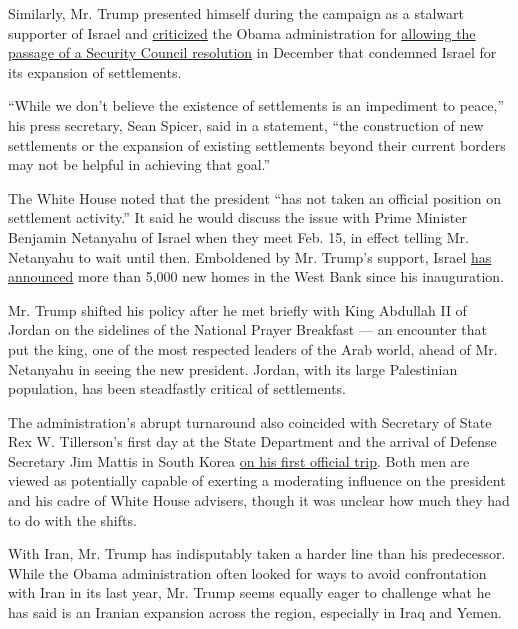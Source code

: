 Similarly, Mr. Trump presented himself during the campaign as a stalwart
supporter of Israel and
\href{https://www.nytimes3xbfgragh.onion/2016/12/22/world/middleeast/donald-trump-united-nations-israel-settlements.html}{criticized}
the Obama administration for
\href{https://www.nytimes3xbfgragh.onion/2016/12/23/world/middleeast/israel-settlements-un-vote.html}{allowing
the passage of a Security Council resolution} in December that condemned
Israel for its expansion of settlements.

``While we don't believe the existence of settlements is an impediment
to peace,'' his press secretary, Sean Spicer, said in a statement, ``the
construction of new settlements or the expansion of existing settlements
beyond their current borders may not be helpful in achieving that
goal.''

The White House noted that the president ``has not taken an official
position on settlement activity.'' It said he would discuss the issue
with Prime Minister Benjamin Netanyahu of Israel when they meet Feb. 15,
in effect telling Mr. Netanyahu to wait until then. Emboldened by Mr.
Trump's support, Israel
\href{https://www.nytimes3xbfgragh.onion/2017/02/01/world/middleeast/israel-3000-homes-west-bank.html}{has
announced} more than 5,000 new homes in the West Bank since his
inauguration.

Mr. Trump shifted his policy after he met briefly with King Abdullah II
of Jordan on the sidelines of the National Prayer Breakfast --- an
encounter that put the king, one of the most respected leaders of the
Arab world, ahead of Mr. Netanyahu in seeing the new president. Jordan,
with its large Palestinian population, has been steadfastly critical of
settlements.

The administration's abrupt turnaround also coincided with Secretary of
State Rex W. Tillerson's first day at the State Department and the
arrival of Defense Secretary Jim Mattis in South Korea
\href{https://www.nytimes3xbfgragh.onion/2017/02/02/world/asia/james-mattis-us-korea-thaad.html}{on
his first official trip}. Both men are viewed as potentially capable of
exerting a moderating influence on the president and his cadre of White
House advisers, though it was unclear how much they had to do with the
shifts.

With Iran, Mr. Trump has indisputably taken a harder line than his
predecessor. While the Obama administration often looked for ways to
avoid confrontation with Iran in its last year, Mr. Trump seems equally
eager to challenge what he has said is an Iranian expansion across the
region, especially in Iraq and Yemen.

